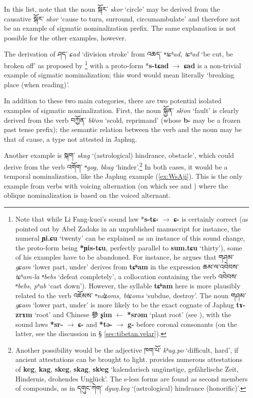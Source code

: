 \documentclass[oneside,a4paper,11pt]{article}
\newcommand{\ipa}[1]{\textbf{{\phon\mbox{#1}}}} %
\newcommand{\zh}[1]{{\cn #1}}
\newcommand{\tibet}[3]{{\tibetain#1} \textit{\phon#2} `#3'}
\begin{document}
In this list, note that the noun \tibet{སྐོར་}{skor}{circle} may be derived from the causative \tibet{སྐོར་}{skor}{cause to turn, surround, circumambulate} and therefore not be an example of sigmatic nominalization prefix. The same explanation is not possible for the other examples, however. 

The derivation of \tibet{ཤད་}{ɕad}{division stroke} from \tibet{འཆད་}{ⁿtɕʰad, tɕʰad}{be cut, be broken off} as proposed by \citet[141]{lifk33}\footnote{Note that while Li Fang-kuei's sound law *\ipa{s-tɕ-} $\rightarrow$ \ipa{ɕ-} is certainly correct (as pointed out by Abel Zadoks in an unpublished manuscript for instance, the numeral \ipa{ɲi.ɕu} `twenty' can be explained as an instance of this sound change, the proto-form being \ipa{*ɲis-tɕu}, perfectly parallel to \ipa{sum.tɕu} `thirty'), some of his examples have to be abandoned. For instance, he argues that \tibet{གཤམ་}{gɕam}{lower part, under} derives from  \ipa{tɕʰam} in the expression \tibet{ཆམ་ལ་འབེབས་}{tɕʰam-la ⁿbebs}{defeat completely}, a collocation containing the verb \tibet{འབེབས་}{ⁿbebs, pʰab}{cast down}). However, the syllable \ipa{tɕʰam} here is more plausibly related to the verb \tibet{འཇོམས་}{ⁿndʑoms, btɕoms}{subdue, destroy}. The noun \tibet{གཤམ་}{gɕam}{lower part, under} is more likely to be the exact cognate of Japhug \ipa{tɤ-zrɤm} `root' and Chinese \zh{參} \ipa{ʂim} $\leftarrow$ \ipa{*srəm} `plant root' (see \citealt{jacques15sr}), with the sound laws \ipa{*sr-} $\rightarrow$ \ipa{ɕ-} and \ipa{*tə-} $\rightarrow$ \ipa{g-} before coronal consonants (on the latter, see the discussion in § \ref{sec:tibetan.velar}). } with a proto-form *\ipa{s-tɕad} $\rightarrow$ \ipa{ɕad} is a non-trivial example of sigmatic nominalization; this word would mean literally `breaking place (when reading)'.  

In addition to these two main categories, there are two potential isolated examples of sigmatic nominalization. First, the noun \tibet{སྐྱོན་}{skʲon}{fault} is clearly derived from the verb \tibet{བཀྱོན་}{bkʲon}{scold, reprimand} (whose \ipa{b-} may be a frozen past tense prefix); the semantic relation between the verb and the noun may be that of cause, a type not attested in Japhug. 

Another example is \tibet{སྐག་}{skag}{(astrological) hindrance, obstacle}, which could derive from the verb \tibet{འགོག་}{ⁿgog, bkag}{hinder}.\footnote{Another possibility would be the adjective \tibet{ཁག་པོ་}{kʰag.po}{difficult, hard}, if ancient attestations can be brought to light. \citet[109]{uebach06woerterbuch02} provides numerous attestations of  \ipa{keg}, \ipa{kag}, \ipa{skeg}, \ipa{skag}, \ipa{skʲeg} `kalendarisch ungünstige, gefährlische Zeit, Hindernis, drohendes Unglück'. The s-less forms are found as second members of compounds, as in \tibet{དགུང་ཀེག་}{dguŋ.keg}{(astrological) hindrance (honorific)}.} In both cases, it would be a temporal nominalization, like the Japhug example (\ref{ex:WsAji}). This is the only example from verbs with voicing alternation (on which see \citealt{jacques12internal} and \citealt{hill14voicing}) where the oblique nominalization is based on the voiced alternant.
\end{document}
